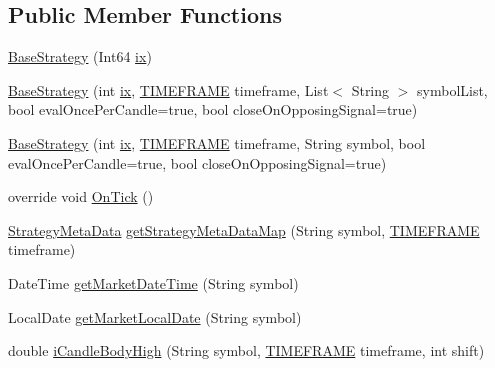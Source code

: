 \subsection*{Public Member Functions}
\begin{DoxyCompactItemize}
\item 
\hyperlink{class_m_q_l4_c_sharp_1_1_base_1_1_base_strategy_a231c5dc25ae1d5d7a5b2fce5d13b6955}{Base\+Strategy} (Int64 \hyperlink{class_m_q_l4_c_sharp_1_1_base_1_1_m_q_l_1_1_m_q_l_expert_a98b5a835bb18c023f5160275efa74619}{ix})
\item 
\hyperlink{class_m_q_l4_c_sharp_1_1_base_1_1_base_strategy_ad9298fbf10f61ebfaa4987c578dcc899}{Base\+Strategy} (int \hyperlink{class_m_q_l4_c_sharp_1_1_base_1_1_m_q_l_1_1_m_q_l_expert_a98b5a835bb18c023f5160275efa74619}{ix}, \hyperlink{namespace_m_q_l4_c_sharp_1_1_base_1_1_enums_a838810aaa87c63c12737408dba8c0b35}{T\+I\+M\+E\+F\+R\+A\+ME} timeframe, List$<$ String $>$ symbol\+List, bool eval\+Once\+Per\+Candle=true, bool close\+On\+Opposing\+Signal=true)
\item 
\hyperlink{class_m_q_l4_c_sharp_1_1_base_1_1_base_strategy_ad0016de1a9107f388312283fe993950d}{Base\+Strategy} (int \hyperlink{class_m_q_l4_c_sharp_1_1_base_1_1_m_q_l_1_1_m_q_l_expert_a98b5a835bb18c023f5160275efa74619}{ix}, \hyperlink{namespace_m_q_l4_c_sharp_1_1_base_1_1_enums_a838810aaa87c63c12737408dba8c0b35}{T\+I\+M\+E\+F\+R\+A\+ME} timeframe, String symbol, bool eval\+Once\+Per\+Candle=true, bool close\+On\+Opposing\+Signal=true)
\item 
override void \hyperlink{class_m_q_l4_c_sharp_1_1_base_1_1_base_strategy_a14e5e1120a81bbe371061169ccc22464}{On\+Tick} ()
\item 
\hyperlink{class_m_q_l4_c_sharp_1_1_base_1_1_common_1_1_strategy_meta_data}{Strategy\+Meta\+Data} \hyperlink{class_m_q_l4_c_sharp_1_1_base_1_1_base_strategy_a977a76cf7c9197b663fa1e60da89f0db}{get\+Strategy\+Meta\+Data\+Map} (String symbol, \hyperlink{namespace_m_q_l4_c_sharp_1_1_base_1_1_enums_a838810aaa87c63c12737408dba8c0b35}{T\+I\+M\+E\+F\+R\+A\+ME} timeframe)
\item 
Date\+Time \hyperlink{class_m_q_l4_c_sharp_1_1_base_1_1_base_strategy_a797f31ba4627dc8db8b529dd3be2a00a}{get\+Market\+Date\+Time} (String symbol)
\item 
Local\+Date \hyperlink{class_m_q_l4_c_sharp_1_1_base_1_1_base_strategy_a271e3cda998662502d7f58f8c2d64b5a}{get\+Market\+Local\+Date} (String symbol)
\item 
double \hyperlink{class_m_q_l4_c_sharp_1_1_base_1_1_base_strategy_a7c451eb421296e526fe59c842e3ec47e}{i\+Candle\+Body\+High} (String symbol, \hyperlink{namespace_m_q_l4_c_sharp_1_1_base_1_1_enums_a838810aaa87c63c12737408dba8c0b35}{T\+I\+M\+E\+F\+R\+A\+ME} timeframe, int shift)

\end{DoxyCompactItemize}
